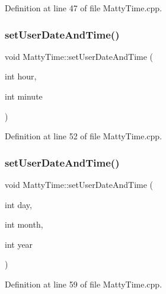Definition at line 47 of file Matty\+Time.\+cpp.

\hypertarget{classMattyTime_a60828ca950added6776f53ca3ea047fc}{}\label{classMattyTime_a60828ca950added6776f53ca3ea047fc} 
\subsubsection{\texorpdfstring{set\+User\+Date\+And\+Time()}{setUserDateAndTime()}\hspace{0.1cm}{\footnotesize\ttfamily [2/5]}}
{\footnotesize\ttfamily void Matty\+Time\+::set\+User\+Date\+And\+Time (\begin{DoxyParamCaption}\item[{int}]{hour,  }\item[{int}]{minute }\end{DoxyParamCaption})}



Definition at line 52 of file Matty\+Time.\+cpp.

\hypertarget{classMattyTime_ac6d00b726df1a8c493452dfc52332f6f}{}\label{classMattyTime_ac6d00b726df1a8c493452dfc52332f6f} 
\subsubsection{\texorpdfstring{set\+User\+Date\+And\+Time()}{setUserDateAndTime()}\hspace{0.1cm}{\footnotesize\ttfamily [3/5]}}
{\footnotesize\ttfamily void Matty\+Time\+::set\+User\+Date\+And\+Time (\begin{DoxyParamCaption}\item[{int}]{day,  }\item[{int}]{month,  }\item[{int}]{year }\end{DoxyParamCaption})}



Definition at line 59 of file Matty\+Time.\+cpp.

\hypertarget{classMattyTime_a34af1776506d7a99387db16982987e1c}{}\label{classMattyTime_a34af1776506d7a99387db16982987e1c} 
